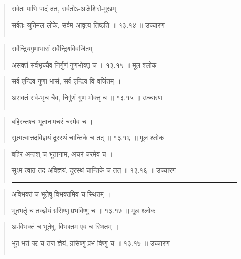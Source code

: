 \begin{quotation}

सर्वतः पाणि पादं तत, सर्वतोऽ-अक्षिशिरो-मुखम्‌  ।  

सर्वतः श्रुतिमल लोके, सर्वम आवृत्य तिष्ठति  ॥ १३.१४ ॥  उच्चारण

\noindent\rule{16cm}{0.4pt} 
\end{quotation}


\begin{quotation}

सर्वेन्द्रियगुणाभासं सर्वेन्द्रियविवर्जितम्‌  ।  

असक्तं सर्वभृच्चैव निर्गुणं गुणभोक्तृ च  ॥ १३.१५ ॥  मूल श्लोक
\end{quotation}

\begin{quotation}

सर्व-एन्द्रिय गुणा-भासं, सर्व-एन्द्रिय वि-वर्जितम्‌  ।  

असक्तं सर्व-भृच चैव, निर्गुणं गुण भोक्तृ च  ॥ १३.१५ ॥  उच्चारण

\noindent\rule{16cm}{0.4pt} 
\end{quotation}


\begin{quotation}

बहिरन्तश्च भूतानामचरं चरमेव च  ।  

सूक्ष्मत्वात्तदविज्ञयं दूरस्थं चान्तिके च तत्‌  ॥ १३.१६ ॥  मूल श्लोक
\end{quotation}

\begin{quotation}

बहिर अन्तश् च भूतानाम, अचरं चरमेव च  ।  

सूक्ष्म-त्वात तद अविज्ञयं, दूरस्थं चान्तिके च तत्‌  ॥ १३.१६ ॥  उच्चारण

\noindent\rule{16cm}{0.4pt} 
\end{quotation}


\begin{quotation}

अविभक्तं च भूतेषु विभक्तमिव च स्थितम्‌  ।  

भूतभर्तृ च तज्ज्ञेयं ग्रसिष्णु प्रभविष्णु च  ॥ १३.१७ ॥  मूल श्लोक
\end{quotation}

\begin{quotation}
अ-विभक्तं च भूतेषु, विभक्तम एव च स्थितम्‌  ।  

भूत-भर्त-ऋ च तज ज्ञेयं, ग्रसिष्णु प्रभ-विष्णु च  ॥ १३.१७ ॥  उच्चारण

\noindent\rule{16cm}{0.4pt} 
\end{quotation}


